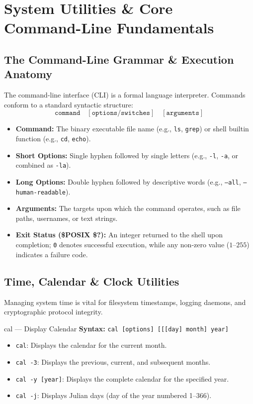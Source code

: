 \chapter{System Utilities \& Core Command-Line Fundamentals}
\label{chap:system-utilities}

\section{The Command-Line Grammar \& Execution Anatomy}
The command-line interface (CLI) is a formal language interpreter. Commands conform to a standard syntactic structure:
\begin{equation}
\texttt{command}\quad [\texttt{options/switches}]\quad [\texttt{arguments}]
\end{equation}

\begin{definition}
\begin{itemize}[leftmargin=1.5em]
    \item \textbf{Command:} The binary executable file name (e.g., \texttt{ls}, \texttt{grep}) or shell builtin function (e.g., \texttt{cd}, \texttt{echo}).
    \item \textbf{Short Options:} Single hyphen followed by single letters (e.g., \texttt{-l}, \texttt{-a}, or combined as \texttt{-la}).
    \item \textbf{Long Options:} Double hyphen followed by descriptive words (e.g., \texttt{--all}, \texttt{--human-readable}).
    \item \textbf{Arguments:} The targets upon which the command operates, such as file paths, usernames, or text strings.
    \item \textbf{Exit Status (\$POSIX \$?):} An integer returned to the shell upon completion; \texttt{0} denotes successful execution, while any non-zero value ($1$--$255$) indicates a failure code.
\end{itemize}
\end{definition}

\section{Time, Calendar \& Clock Utilities}
Managing system time is vital for filesystem timestamps, logging daemons, and cryptographic protocol integrity.

\begin{commandbox}{cal --- Display Calendar}
\textbf{Syntax:} \texttt{cal [options] [[[day] month] year]}
\begin{itemize}[leftmargin=1.5em]
    \item \texttt{cal}: Displays the calendar for the current month.
    \item \texttt{cal -3}: Displays the previous, current, and subsequent months.
    \item \texttt{cal -y [year]}: Displays the complete calendar for the specified year.
    \item \texttt{cal -j}: Displays Julian days (day of the year numbered 1--366).
\end{itemize}
\end{commandbox}


